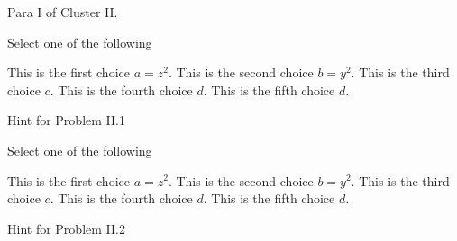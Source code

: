 \begin{cluster}[Cluster I]
\begin{gram}[140]
Para I of Cluster II.
\end{gram}

\begin{flex}
\begin{problem}
Select one of the following
\begin{pickone}
\choice This is the first choice $a = z^2$.
\choice This is the second choice $b = y^2$.
\correctchoice This is the third choice $c$.
\correctchoice This is the fourth choice $d$.
\choice This is the fifth choice $d$.
\end{pickone}

\end{problem}

\begin{hint}[160]
Hint  for Problem II.1
\end{hint}
\end{flex}

\begin{flex}
\begin{problem}
Select one of the following
\begin{pickany}
\choice This is the first choice $a = z^2$.
\choice This is the second choice $b = y^2$.
\correctchoice This is the third choice $c$.
\correctchoice This is the fourth choice $d$.
\choice This is the fifth choice $d$.
\end{pickany}

\end{problem}

\begin{hint}[180]
Hint  for Problem II.2
\end{hint}
\end{flex}
\end{cluster}
